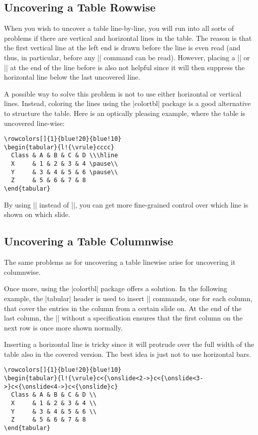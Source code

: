 \subsection{Uncovering a Table Rowwise}

When you wish to uncover a table line-by-line, you will run into all sorts of problems if there are vertical and horizontal lines in the table. The reason is that the first vertical line at the left end is drawn before the line is even read (and thus, in particular, before any |\onslide| command can be read). However, placing a |\pause| or |\uncover| at the end of the line before is also not helpful since it will then suppress the horizontal line below the last uncovered line.

A possible way to solve this problem is not to use either horizontal or vertical lines. Instead, coloring the lines using the |colortbl| package is a good alternative to structure the table. Here is an optically pleasing example, where the table is uncovered line-wise:
\begin{verbatim}
\rowcolors[]{1}{blue!20}{blue!10}
\begin{tabular}{l!{\vrule}cccc}
  Class & A & B & C & D \\\hline
  X     & 1 & 2 & 3 & 4 \pause\\
  Y     & 3 & 4 & 5 & 6 \pause\\
  Z     & 5 & 6 & 7 & 8
\end{tabular}
\end{verbatim}

By using |\onslide| instead of |\pause|, you can get more fine-grained control over which line is shown on which slide.


\subsection{Uncovering a Table Columnwise}

The same problems as for uncovering a table linewise arise for uncovering it columnwise.

Once more, using the |colortbl| package offers a solution. In the following example, the |tabular| header is used to insert |\onslide| commands, one for each column, that cover the entries in the column from a certain slide on. At the end of the last column, the |\onslide| without a specification ensures that the first column on the next row is once more shown normally.

Inserting a horizontal line is tricky since it will protrude over the full width of the table also in the covered version. The best idea is just not to use horizontal bars.
\begin{verbatim}
\rowcolors[]{1}{blue!20}{blue!10}
\begin{tabular}{l!{\vrule}c<{\onslide<2->}c<{\onslide<3->}c<{\onslide<4->}c<{\onslide}c}
  Class & A & B & C & D \\
  X     & 1 & 2 & 3 & 4 \\
  Y     & 3 & 4 & 5 & 6 \\
  Z     & 5 & 6 & 7 & 8
\end{tabular}
\end{verbatim}

